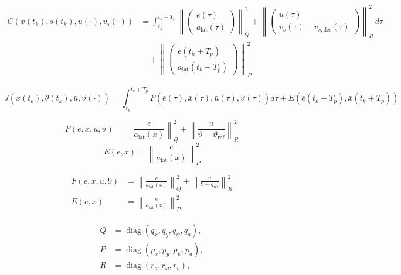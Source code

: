 \begin{equation}
    \begin{aligned}
    C(x(t_k), s(t_k), u(\cdot), v_s(\cdot)) &= \int_{t_k}^{t_k + T_p} \left\| 
    \begin{pmatrix}
    e(\tau) \\
    a_{\text{lat}}(\tau)
    \end{pmatrix}
    \right\|_Q^2 + \left\| 
    \begin{pmatrix}
    u(\tau) \\
    v_s(\tau) - v_{s, \text{des}}(\tau)
    \end{pmatrix}
    \right\|_R^2 \, d\tau \\
    &\quad + \left\| 
    \begin{pmatrix}
    e(t_k + T_p) \\
    a_{\text{lat}}(t_k + T_p)
    \end{pmatrix}
    \right\|_P^2
    \end{aligned}
\end{equation}

\begin{equation}
    J(x(t_k),\theta(t_k),\bar{u},\bar{\vartheta}(\cdot)) = \int_{t_k}^{t_k + T_p} F(\bar{e}(\tau),\bar{x}(\tau),\bar{u}(\tau),\bar{\vartheta}(\tau))d\tau + E(\bar{e}(t_k+T_p),\bar{x}(t_k+T_p))
\end{equation}

\begin{equation}
    F(e, x, u, \vartheta) = 
    \left\| \frac{e}{a_{\text{lat}}(x)} \right\|^2_Q + 
    \left\| \frac{u}{\vartheta - \vartheta_{\text{ref}}} \right\|^2_R
\end{equation}
\begin{equation}
    E(e, x) = \left\| \frac{e}{a_{\text{lat}}(x)} \right\|^2_P
\end{equation}

\begin{align}
    F(e, x, u, 9) &= \left\| \frac{e}{a_{\text{lat}}(x)} \right\|_Q^2 + \left\| \frac{u}{9 - g_{\text{ref}}} \right\|_R^2 \label{eq:F} \\
    E(e, x) &= \left\| \frac{e}{a_{\text{lat}}(x)} \right\|_P^2 \label{eq:E}
\end{align}

\begin{equation}
    \begin{split}
        Q &= \operatorname{diag}(q_x, q_y, q_\psi, q_a), \\
        P &= \operatorname{diag}(p_x, p_y, p_\psi, p_a), \\
        R &= \operatorname{diag}(r_a, r_\omega, r_v),
    \end{split}
\end{equation}



